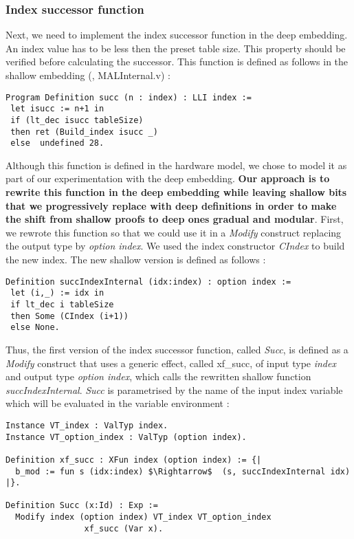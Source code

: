 \subsubsection{Index successor function}
Next, we need to implement the index successor function in the deep embedding. An index value has to be less then the preset table size. This property should be verified before calculating the successor. This function is defined as follows in the shallow embedding (\cite{PIP}, MALInternal.v) :
\begin{lstlisting}[caption = {Index successor function in the shallow embedding},xleftmargin=.04\textwidth,
xrightmargin=.04\textwidth,label={indexShal}]
Program Definition succ (n : index) : LLI index :=
 let isucc := n+1 in
 if (lt_dec isucc tableSize)
 then ret (Build_index isucc _)
 else  undefined 28.
\end{lstlisting} \vspace{4pt}
Although this function is defined in the hardware model, we chose to model it as part of our experimentation with the deep embedding. \textbf{Our approach is to rewrite this function in the deep embedding while leaving shallow bits that we progressively replace with deep definitions in order to make the shift from shallow proofs to deep ones gradual and modular}. First, we rewrote this function so that we could use it in a \textit{Modify} construct replacing the output type by \textit{option index}. We used the index constructor \textit{CIndex} to build the new index. The new shallow version is defined as follows : \pagebreak
\begin{lstlisting}[caption={Rewritten shallow index successor function},xleftmargin=-.01\textwidth,
xrightmargin=-.01\textwidth,label={succInt}]
Definition succIndexInternal (idx:index) : option index :=
 let (i,_) := idx in 
 if lt_dec i tableSize 
 then Some (CIndex (i+1)) 
 else None.
\end{lstlisting} \vspace{4pt}
Thus, the first version of the index successor function, called \textit{Succ}, is defined as a \textit{Modify} construct that uses a generic effect, called xf\_succ, of input type \textit{index} and output type \textit{option index}, which calls the rewritten shallow function \textit{succIndexInternal}. \textit{Succ} is parametrised by the name of the input index variable which will be evaluated in the variable environment : 
\begin{lstlisting}[caption = {Definition of Succ},xleftmargin=-.02\textwidth,
xrightmargin=-.02\textwidth, mathescape=true,label={SuccFn}]
Instance VT_index : ValTyp index.
Instance VT_option_index : ValTyp (option index).

Definition xf_succ : XFun index (option index) := {|
  b_mod := fun s (idx:index) $\Rightarrow$  (s, succIndexInternal idx)
|}.

Definition Succ (x:Id) : Exp :=
  Modify index (option index) VT_index VT_option_index 
  	            xf_succ (Var x).
\end{lstlisting} \vspace{4pt}

